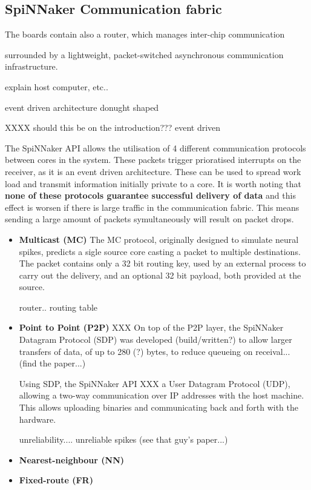 \subsection{SpiNNaker Communication fabric}

The boards contain also a router, which manages inter-chip communication 


surrounded by a lightweight, packet-switched asynchronous communication infrastructure.

explain host computer, etc..


event driven architecture
donught shaped


XXXX should this be on the introduction???
event driven

The SpiNNaker API allows the utilisation of 4 different communication protocols between cores in the system. These packets trigger prioratised interrupts on the receiver, as it is an event driven architecture. These can be used to spread work load and transmit information initially private to a core.
It is worth noting that \textbf{none of these protocols guarantee successful delivery of data} and this effect is worsen if there is large traffic in the communication fabric. This means sending a large amount of packets symultaneously will result on packet drops.

\begin{itemize}
\item \textbf{Multicast (MC)}
The MC protocol, originally designed to simulate neural spikes, predicts a sigle source core casting a packet to multiple destinations. The packet contains only a 32 bit routing key, used by an external process to carry out the delivery, and an optional 32 bit payload, both provided at the source.

router.. routing table
\item \textbf{Point to Point (P2P)}
XXX
On top of the P2P layer, the SpiNNaker Datagram Protocol (SDP) was developed (build/written?) to allow larger transfers of data, of up to 280 (?) bytes, to reduce queueing on receival... (find the paper...)

Using SDP, the SpiNNaker API XXX a User Datagram Protocol (UDP), allowing a two-way communication over IP addresses with the host machine. This allows uploading binaries and communicating back and forth with the hardware.

unreliability....
unreliable spikes (see that guy's paper...)

\item \textbf{Nearest-neighbour (NN)}
\item \textbf{Fixed-route (FR)}
\end{itemize}

